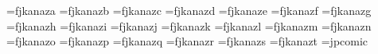 \font\fjkanaza=fjkanaza
\font\fjkanazb=fjkanazb
\font\fjkanazc=fjkanazc
\font\fjkanazd=fjkanazd
\font\fjkanaze=fjkanaze
\font\fjkanazf=fjkanazf
\font\fjkanazg=fjkanazg
\font\fjkanazh=fjkanazh
\font\fjkanazi=fjkanazi
\font\fjkanazj=fjkanazj
\font\fjkanazk=fjkanazk
\font\fjkanazl=fjkanazl
\font\fjkanazm=fjkanazm
\font\fjkanazn=fjkanazn
\font\fjkanazo=fjkanazo
\font\fjkanazp=fjkanazp
\font\fjkanazq=fjkanazq
\font\fjkanazr=fjkanazr
\font\fjkanazs=fjkanazs
\font\fjkanazt=fjkanazt
\font\jpcomic=jpcomic
